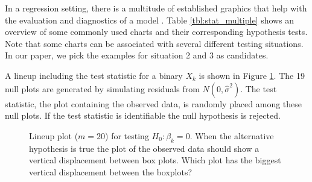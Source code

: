 \documentclass{article}
\begin{document}
In a regression setting, there is a multitude of established graphics that help with the evaluation and diagnostics of a model \citep{cook:99}. Table \ref{tbl:stat_multiple} shows an overview of some commonly used charts and their corresponding hypothesis tests. Note that some charts can be associated with several different testing situations. In our paper, we pick the examples for situation 2 and 3 as candidates.

A lineup including the test statistic  for a binary $X_k$ is shown in Figure \ref{fig:test_category}. The 19 null plots are generated  by simulating residuals from $N(0,\hat{\sigma}^2)$. The test statistic, the plot containing the observed data, is randomly placed among these null plots. If the test statistic is identifiable the null hypothesis is rejected. %

\begin{figure}[hbt]
   \centering
       \caption{Lineup plot ($m=20$) for testing $H_0: \beta_k=0$. When the alternative hypothesis is true the plot of the observed data should show a vertical displacement between box plots. Which plot has the biggest vertical displacement between the boxplots?}
       \label{fig:test_category}
\end{figure}
\end{document}
